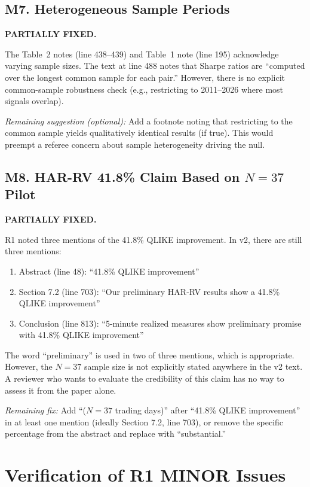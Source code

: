 \documentclass[12pt,a4paper]{article}
\begin{document}
\subsection*{M7. Heterogeneous Sample Periods}
\textcolor{warncolor}{\textbf{PARTIALLY FIXED.}}

The Table~2 notes (line 438--439) and Table~1 note (line 195) acknowledge varying sample sizes. The text at line 488 notes that Sharpe ratios are ``computed over the longest common sample for each pair.'' However, there is no explicit common-sample robustness check (e.g., restricting to 2011--2026 where most signals overlap).

\textit{Remaining suggestion (optional):} Add a footnote noting that restricting to the common sample yields qualitatively identical results (if true). This would preempt a referee concern about sample heterogeneity driving the null.


\subsection*{M8. HAR-RV 41.8\% Claim Based on $N = 37$ Pilot}
\textcolor{warncolor}{\textbf{PARTIALLY FIXED.}}

R1 noted three mentions of the 41.8\% QLIKE improvement. In v2, there are still three mentions:
\begin{enumerate}
    \item Abstract (line 48): ``41.8\% QLIKE improvement''
    \item Section 7.2 (line 703): ``Our preliminary HAR-RV results show a 41.8\% QLIKE improvement''
    \item Conclusion (line 813): ``5-minute realized measures show preliminary promise with 41.8\% QLIKE improvement''
\end{enumerate}

The word ``preliminary'' is used in two of three mentions, which is appropriate. However, the $N = 37$ sample size is not explicitly stated anywhere in the v2 text. A reviewer who wants to evaluate the credibility of this claim has no way to assess it from the paper alone.

\textit{Remaining fix:} Add ``($N = 37$ trading days)'' after ``41.8\% QLIKE improvement'' in at least one mention (ideally Section 7.2, line 703), or remove the specific percentage from the abstract and replace with ``substantial.''


\section*{Verification of R1 MINOR Issues}
\end{document}
